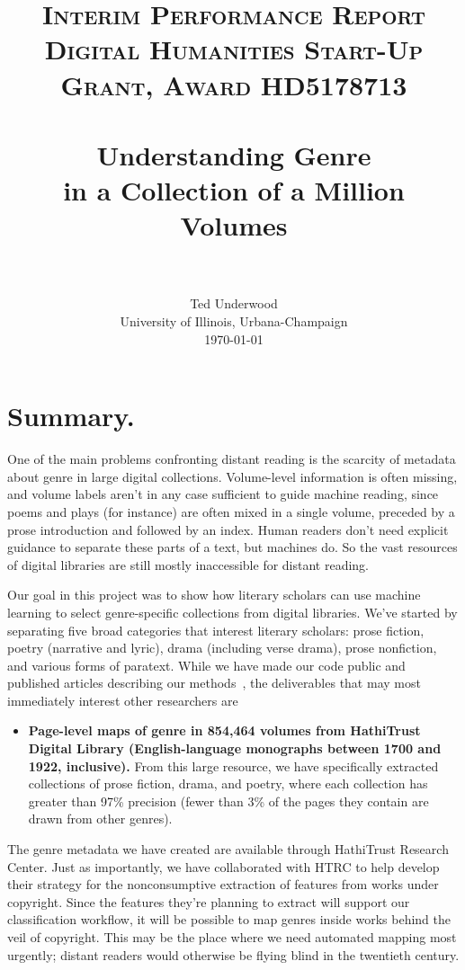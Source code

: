 \documentclass[paper=a4, fontsize=12pt]{scrartcl}
\title{
		\usefont{OT1}{bch}{b}{n}
		\normalfont \normalsize \textsc{Interim Performance Report\\Digital Humanities Start-Up Grant, Award HD5178713} \\ [25pt]
		\horrule{0.5pt} \\[0.4cm]
		\huge Understanding Genre\\in a Collection of a Million Volumes \\
		\horrule{2pt} \\[0.5cm]
}
\author{
        Ted Underwood\\University of Illinois, Urbana-Champaign\\	
        \today
}
\date{}
\numberwithin{equation}{section}		%
\numberwithin{figure}{section}			%
\numberwithin{table}{section}				%
\begin{document}
\maketitle
\thispagestyle{empty}
\newpage
\setcounter{page}{1}
\normalsize
{}
\tableofcontents
\newpage
\section{Summary.} 
One of the main problems confronting distant reading is the scarcity of metadata about genre in large digital collections. Volume-level information is often missing, and volume labels aren't in any case sufficient to guide machine reading, since poems and plays (for instance) are often mixed in a single volume, preceded by a prose introduction and followed by an index. Human readers don't need explicit guidance to separate these parts of a text, but machines do. So the vast resources of digital libraries are still mostly inaccessible for distant reading.

Our goal in this project was to show how literary scholars can use machine learning to select genre-specific collections from digital libraries. We've started by separating five broad categories that interest literary scholars: prose fiction, poetry (narrative and lyric), drama (including verse drama), prose nonfiction, and various forms of paratext. While we have made our code public and published articles describing our methods~\cite{underwood:mutable, underwood:blurry, underwood:slate, underwood:genrerepo}, the deliverables that may most immediately interest other researchers are
\begin{itemize}
\item \textbf{Page-level maps of genre in 854,464 volumes from HathiTrust Digital Library (English-language monographs between 1700 and 1922, inclusive).} From this large resource, we have specifically extracted collections of prose fiction, drama, and poetry, where each collection has greater than 97\% precision (fewer than 3\% of the pages they contain are drawn from other genres).
\end{itemize}

The genre metadata we have created are available through HathiTrust Research Center. Just as importantly, we have collaborated with HTRC to help develop their strategy for the nonconsumptive extraction of features from works under copyright. Since the features they're planning to extract will support our classification workflow, it will be possible to map genres inside works behind the veil of copyright. This may be the place where we need automated mapping most urgently; distant readers would otherwise be flying blind in the twentieth century.
\end{document}

